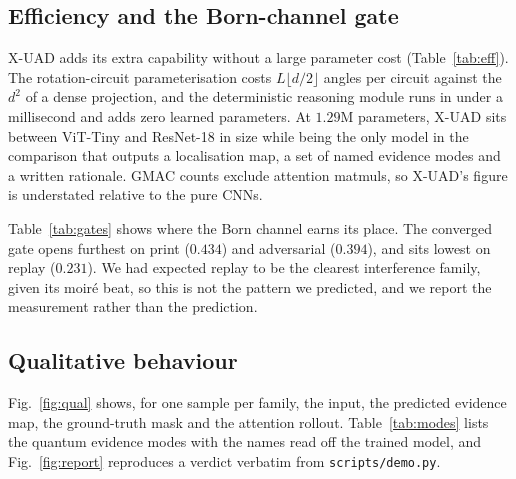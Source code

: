 \documentclass[conference]{IEEEtran}
\begin{document}
\subsection{Efficiency and the Born-channel gate}
X-UAD adds its extra capability without a large parameter cost
(Table~\ref{tab:eff}). The rotation-circuit parameterisation costs
$L\lfloor d/2\rfloor$ angles per circuit against the $d^{2}$ of a dense projection,
and the deterministic reasoning module runs in under a millisecond and adds zero
learned parameters. At $1.29$M parameters, X-UAD sits between ViT-Tiny and
ResNet-18 in size while being the only model in the comparison that outputs a
localisation map, a set of named evidence modes and a written rationale. GMAC counts
exclude attention matmuls, so X-UAD's figure is understated relative to the pure
CNNs.

\begin{table}[t]
\centering
\caption{Inference cost, CPU, single $112\times112$ crop.}
\label{tab:eff}
\small
\resizebox{\linewidth}{!}{}
\end{table}

Table~\ref{tab:gates} shows where the Born channel earns its place. The converged
gate opens furthest on print ($0.434$) and adversarial ($0.394$), and sits lowest on
replay ($0.231$). We had expected replay to be the clearest interference family,
given its moir\'e beat, so this is not the pattern we predicted, and we report the
measurement rather than the prediction.

\begin{table}[t]
\centering
\caption{Converged adaptive gate $g$, the fraction of the attention score taken from
the Born channel, averaged over heads, layers, and test samples of each family.}
\label{tab:gates}
\small

\end{table}

\subsection{Qualitative behaviour}\label{sec:qual}
Fig.~\ref{fig:qual} shows, for one sample per family, the input, the predicted
evidence map, the ground-truth mask and the attention rollout. Table~\ref{tab:modes}
lists the quantum evidence modes with the names read off the trained model, and
Fig.~\ref{fig:report} reproduces a verdict verbatim from \texttt{scripts/demo.py}.

\begin{table}[t]
\centering
\caption{The quantum evidence basis after training. Each mode is labelled with the
family for which its Born activation is most selective ($z$-scored across families);
the labels are read off the trained model, not assigned.}
\label{tab:modes}
\small
\resizebox{\linewidth}{!}{}
\end{table}
\end{document}

